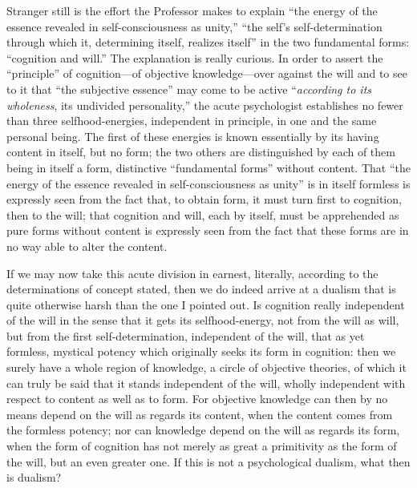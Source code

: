 \documentclass[12pt]{book}
\newcommand{\opage}[1]{\marginnote{\footnotesize\textit{[#1]}}}
\begin{document}
Stranger still is the effort the Professor makes to explain ``the energy
of the essence revealed in self-consciousness as unity,'' ``the self's
self-determination through which it, determining itself,
realizes itself'' in the two fundamental forms: ``cognition and will.''
The explanation is really curious. In order to assert the ``principle'' of
cognition---of objective knowledge---over against the will and to see to
it that ``the subjective essence''
\opage{39}\setcounter{footnote}{0}%
may come to be active ``\emph{according to its wholeness}, its undivided
personality,'' the acute psychologist establishes no fewer than three
selfhood-energies, independent in principle, in one and the same personal
being. The first of these energies is known essentially by its having
content in itself, but no form; the two others are distinguished by each
of them being in itself a form, distinctive ``fundamental forms'' without
content. That ``the energy of the essence revealed in self-consciousness
as unity'' is in itself formless is expressly seen from the fact that, to
obtain form, it must turn first to cognition, then to the will; that
cognition and will, each by itself, must be apprehended as pure forms
without content is expressly seen from the fact that these forms are in
no way able to alter the content.

If we may now take this acute division in earnest, literally, according to
the determinations of concept stated, then we do indeed arrive at a
dualism that is quite otherwise harsh than the one I pointed out. Is
cognition really independent of the will in the sense that it gets its
selfhood-energy, not from the will as will, but from the first
self-determination, independent of the will, that as yet formless,
mystical potency which originally seeks its form in cognition: then we
surely have a whole region of knowledge, a circle of objective theories, of
which it can truly be said that it stands independent of the will, wholly
independent with respect to content as well as to form. For objective
knowledge can then by no means depend on the will as regards its content,
when the content comes from the formless potency; nor can knowledge depend
on the will as regards its form, when the form of cognition has not merely
as great a primitivity as the form of the will, but an even greater one.
\opage{40}\setcounter{footnote}{0}%
If this is not a psychological dualism, what then is dualism?
\end{document}
